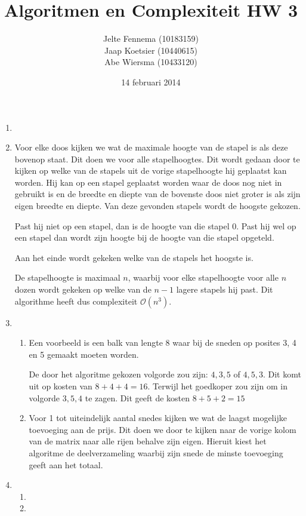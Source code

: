 \documentclass[11pt]{article}
\title{\textbf{Algoritmen en Complexiteit HW 3}}
\author{Jelte Fennema (10183159)\\
		Jaap Koetsier (10440615)\\
        Abe Wiersma (10433120)}
\date{14 februari 2014}
\newcommand{\bigO}{\ensuremath{\mathcal{O}}}
\begin{document}
\maketitle

\begin{enumerate}
    \item

    \item
        Voor elke doos kijken we wat de maximale hoogte van de stapel is als
        deze bovenop staat. Dit doen we voor alle stapelhoogtes. Dit wordt
        gedaan door te kijken op welke van de stapels uit de vorige stapelhoogte
        hij geplaatst kan worden. Hij kan op een stapel geplaatst worden waar de
        doos nog niet in gebruikt is en de breedte en diepte van de bovenste
        doos niet groter is als zijn eigen breedte en diepte. Van deze gevonden
        stapels wordt de hoogste gekozen.

        Past hij niet op een stapel, dan is de hoogte van die stapel 0. Past hij
        wel op een stapel dan wordt zijn hoogte bij de hoogte van die stapel
        opgeteld.

        Aan het einde wordt gekeken welke van de stapels het hoogste is.

        De stapelhoogte is maximaal $n$, waarbij voor elke stapelhoogte voor
        alle $n$ dozen wordt gekeken op welke van de $n - 1$ lagere stapels hij
        past. Dit algorithme heeft dus complexiteit \bigO$(n^3)$.

    \item
        \begin{enumerate}
            \item
                Een voorbeeld is een balk van lengte 8 waar bij de sneden op
                posites 3, 4 en 5 gemaakt moeten worden.

                De door het algoritme gekozen volgorde zou zijn: $4, 3, 5$ of
                $4, 5, 3$. Dit komt uit op kosten van $8+4+4=16$. Terwijl het
                goedkoper zou zijn om in volgorde $3, 5, 4$ te zagen. Dit geeft
                de kosten $8+5+2=15$

            \item
                Voor 1 tot uiteindelijk aantal snedes kijken we wat de
                laagst mogelijke toevoeging aan de prijs. Dit doen we door te
                kijken naar de vorige kolom van de matrix naar alle rijen
                behalve zijn eigen. Hieruit kiest het algoritme de
                deelverzameling waarbij zijn snede de minste toevoeging geeft
                aan het totaal.
        \end{enumerate}

    \item
        \begin{enumerate}
            \item
            \item
        \end{enumerate}

\end{enumerate}
\end{document}
